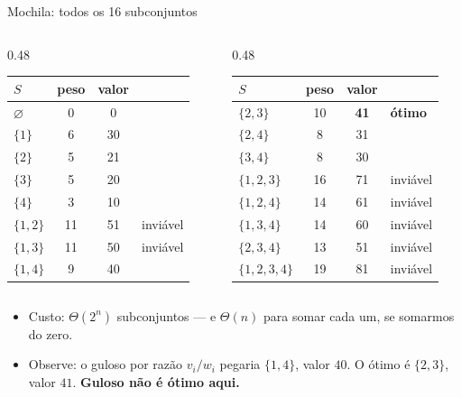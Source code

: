 \documentclass[aspectratio=169]{beamer}
\begin{document}
\begin{frame}{Mochila: todos os 16 subconjuntos}
  \begin{columns}[T]
    \begin{column}{0.48\textwidth}
      \centering\scriptsize
      \begin{tabular}{@{}lccl@{}}
        \toprule
        $S$ & peso & valor & \\
        \midrule
        $\varnothing$ & 0  & 0  & \\
        $\{1\}$       & 6  & 30 & \\
        $\{2\}$       & 5  & 21 & \\
        $\{3\}$       & 5  & 20 & \\
        $\{4\}$       & 3  & 10 & \\
        $\{1,2\}$     & 11 & 51 & inviável \\
        $\{1,3\}$     & 11 & 50 & inviável \\
        $\{1,4\}$     & 9  & 40 & \\
        \bottomrule
      \end{tabular}
    \end{column}
    \begin{column}{0.48\textwidth}
      \centering\scriptsize
      \begin{tabular}{@{}lccl@{}}
        \toprule
        $S$ & peso & valor & \\
        \midrule
        $\{2,3\}$     & 10 & \textbf{41} & \textbf{ótimo} \\
        $\{2,4\}$     & 8  & 31 & \\
        $\{3,4\}$     & 8  & 30 & \\
        $\{1,2,3\}$   & 16 & 71 & inviável \\
        $\{1,2,4\}$   & 14 & 61 & inviável \\
        $\{1,3,4\}$   & 14 & 60 & inviável \\
        $\{2,3,4\}$   & 13 & 51 & inviável \\
        $\{1,2,3,4\}$ & 19 & 81 & inviável \\
        \bottomrule
      \end{tabular}
    \end{column}
  \end{columns}
  \medskip
  \begin{itemize}
    \item Custo: $\Theta(2^n)$ subconjuntos --- e $\Theta(n)$ para somar cada um,
      se somarmos do zero.
    \item Observe: o guloso por razão $v_i/w_i$ pegaria $\{1,4\}$, valor $40$.
      O ótimo é $\{2,3\}$, valor $41$. \textbf{Guloso não é ótimo aqui.}
  \end{itemize}
\end{frame}
\end{document}
